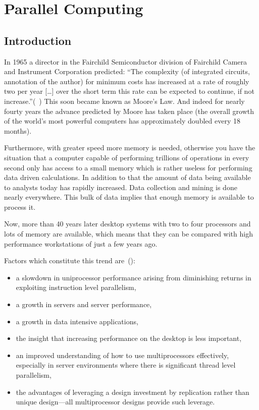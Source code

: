 \chapter{Parallel Computing}
\label{chap:parallelcomputing}
\section{Introduction}

In 1965 a director in the Fairchild Semiconductor division of
Fairchild Camera and Instrument Corporation predicted: ``The complexity
(of integrated circuits, annotation of the author)
for minimum costs has increased at a rate of roughly two per year
[\ldots] over the short term this rate can be expected to continue, if
not increase.''(~\cite{moore65integratedcircuits}) This soon became known
as Moore's Law. And 
indeed for nearly fourty years the advance predicted by Moore has
taken place (the overall growth of the world's most powerful computers
has approximately doubled every 18 months).

Furthermore, with greater speed more memory is needed, otherwise you have
the situation that a computer capable of performing trillions of
operations in every second only has access to a small memory which is
rather useless for performing data driven calculations. In addition to
that the amount of data being available to analysts today has rapidly
increased. Data collection and mining is done nearly everywhere. This
bulk of data implies that enough memory is available to process it.

Now, more than 40 years later desktop systems with two to four
processors and lots of memory are available, which means that they can
be compared with high performance workstations of just a few years
ago.

Factors which constitute this trend are~(\cite{C1quant07}):
\begin{itemize}
\item a slowdown in uniprocessor performance arising from diminishing
  returns in exploiting instruction level parallelism,
\item a growth in servers and server performance,
\item a growth in data intensive applications,
\item the insight that increasing performance on the desktop is less
  important,
\item an improved understanding of how to use multiprocessors
  effectively, especially in server environments where there is
  significant thread level parallelism,
\item the advantages of leveraging a design investment by replication
  rather than unique design---all multiprocessor designs provide such leverage.
\end{itemize}

